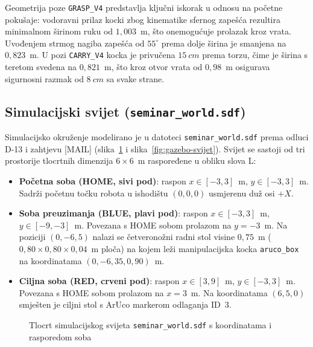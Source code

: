 Geometrija poze \texttt{GRASP\_V4} predstavlja ključni iskorak u odnosu na početne pokušaje: vodoravni
prilaz kocki zbog kinematike sfernog zapešća rezultira minimalnom širinom ruku od $1{,}003$~m, što
onemogućuje prolazak kroz vrata. Uvođenjem strmog nagiba zapešća od $55^\circ$ prema dolje širina
je smanjena na $0{,}823$~m. U pozi \texttt{CARRY\_V4} kocka je privučena $\SI{15}{cm}$ prema torzu,
čime je širina s teretom svedena na $0{,}821$~m, što kroz otvor vrata od $0{,}98$~m osigurava sigurnosni
razmak od $\SI{8}{cm}$ sa svake strane.

\subsection{Simulacijski svijet (\texttt{seminar\_world.sdf})}
\label{sec:03-svijet}

Simulacijsko okruženje modelirano je u datoteci \texttt{seminar\_world.sdf} prema odluci D-13 i
zahtjevu [MAIL] \cite{mail2026} (slika~\ref{fig:tlocrt-svijeta} i slika~\ref{fig:gazebo-svijet}).
Svijet se sastoji od tri prostorije tlocrtnih dimenzija $6 \times 6$~m raspoređene u obliku slova L:
\begin{itemize}
  \item \textbf{Početna soba (HOME, sivi pod)}: raspon $x \in [-3, 3]$~m, $y \in [-3, 3]$~m. Sadrži početnu točku robota u ishodištu $(0, 0, 0)$ usmjerenu duž osi $+X$.
  \item \textbf{Soba preuzimanja (BLUE, plavi pod)}: raspon $x \in [-3, 3]$~m, $y \in [-9, -3]$~m. Povezana s HOME sobom prolazom na $y = -3$~m. Na poziciji $(0, -6{,}5)$ nalazi se četveronožni radni stol visine $0{,}75$~m ($0{,}80 \times 0{,}80 \times 0{,}04$~m ploča) na kojem leži manipulacijska kocka \texttt{aruco\_box} na koordinatama $(0, -6{,}35, 0{,}90)$~m.
  \item \textbf{Ciljna soba (RED, crveni pod)}: raspon $x \in [3, 9]$~m, $y \in [-3, 3]$~m. Povezana s HOME sobom prolazom na $x = 3$~m. Na koordinatama $(6{,}5, 0)$ smješten je ciljni stol s ArUco markerom odlaganja ID~3.
\end{itemize}

\begin{figure}[H]
  \centering
  
  \caption{Tlocrt simulacijskog svijeta \texttt{seminar\_world.sdf} s koordinatama i rasporedom soba}
  \label{fig:tlocrt-svijeta}
\end{figure}


